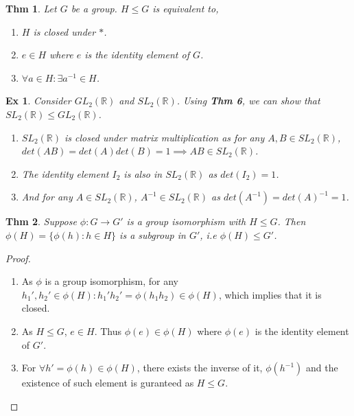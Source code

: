 \documentclass[paper=a4, fontsize=11pt]{scrartcl}
\newcommand{\nextline}{$ $ \newline \vspace{-0.15in}}
\newtheorem{theorem}{Thm}
\newtheorem{example}{Ex}
\begin{document}
\begin{theorem}
	Let $G$ be a group. $H \leqslant G$ is equivalent to, 
	\begin{enumerate}
		\item $H$ is closed under $\ast$.
		\item $e \in H$ where $e$ is the identity element of $G$.
		\item $\forall a \in H : \exists a^{-1} \in H$. \\
	\end{enumerate}
\end{theorem}

\begin{example}
	Consider $GL_2 (\mathbb{R})$ and $SL_2(\mathbb{R})$. Using \textbf{Thm 6}, we can show that $SL_2(\mathbb{R}) \leqslant GL_2(\mathbb{R})$.
	\begin{enumerate}
		\item $SL_2(\mathbb{R})$ is closed under matrix multiplication as for any $A,B \in SL_2(\mathbb{R})$,  $det(AB)=det(A)det(B)=1 \implies AB \in SL_2(\mathbb{R})$.
		\item The identity element $I_2$ is also in $SL_2(\mathbb{R})$ as $det(I_2)=1$.
		\item And for any $A \in SL_2(\mathbb{R})$, $A^{-1} \in SL_2(\mathbb{R})$ as $det(A^{-1})=det(A)^{-1}=1$.\\
	\end{enumerate}
\end{example}

\begin{theorem}
	Suppose $\phi : G \to G'$ is a group isomorphism with $H \leqslant G$. Then $\phi(H)=\{\phi(h) : h\in H \}$ is a subgroup in $G'$, i.e $\phi(H) \leqslant G'$.\\
\end{theorem}

\begin{proof}
\nextline
\begin{enumerate}
	\item As $\phi$ is a group isomorphism, for any $h_1' ,h_2' \in \phi(H) : h_1'h_2' = \phi(h_1h_2)\in \phi(H) $, which implies that it is closed.
	\item As $H \leqslant G$, $e \in H$. Thus $\phi(e) \in \phi(H)$ where $\phi(e)$ is the identity element of $G'$.
	\item For $\forall h'=\phi(h) \in \phi(H)$, there exists the inverse of it, $\phi(h^{-1})$ and the existence of such element is guranteed as $H\leqslant G$. 
\end{enumerate}
\end{proof}
\end{document}
